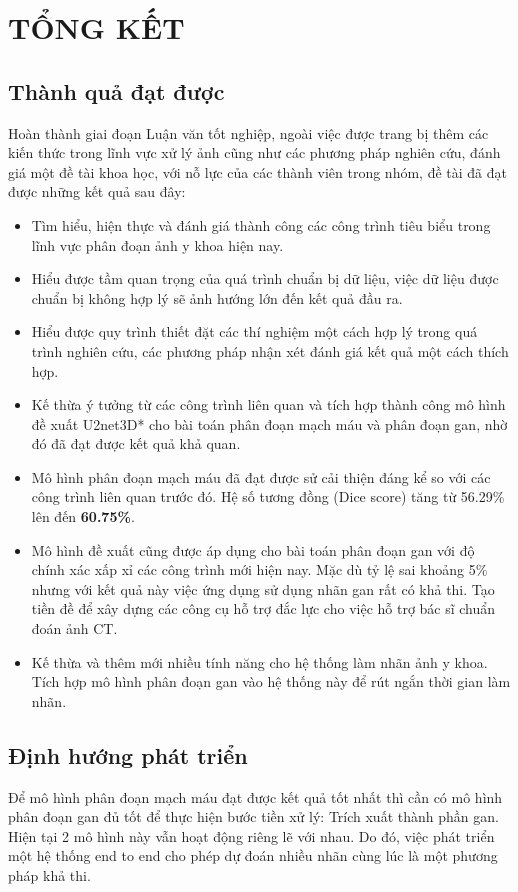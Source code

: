 \chapter{TỔNG KẾT}\label{chap:conclusion}
\section{Thành quả đạt được}
Hoàn thành giai đoạn Luận văn tốt nghiệp, ngoài việc được trang bị thêm các kiến thức trong lĩnh vực xử lý ảnh cũng như các phương pháp nghiên cứu, đánh giá một đề tài khoa học, với nỗ lực của các thành viên trong nhóm, đề tài đã đạt được những kết quả sau đây:
\vspace{-0.4cm}
\begin{itemize}
    \item Tìm hiểu, hiện thực và đánh giá thành công các công trình tiêu biểu trong lĩnh vực phân đoạn ảnh y khoa hiện nay.
    \item Hiểu được tầm quan trọng của quá trình chuẩn bị dữ liệu, việc dữ liệu được chuẩn bị không hợp lý sẽ ảnh hướng lớn đến kết quả đầu ra.
    \item Hiểu được quy trình thiết đặt các thí nghiệm một cách hợp lý trong quá trình nghiên cứu, các phương pháp nhận xét đánh giá kết quả một cách thích hợp.
    \item Kế thừa ý tưởng từ các công trình liên quan và tích hợp thành công mô hình đề xuất U2net3D* cho bài toán phân đoạn mạch máu và phân đoạn gan, nhờ đó đã đạt được kết quả khả quan.
    \item Mô hình phân đoạn mạch máu đã đạt được sử cải thiện đáng kể so với các công trình liên quan trước đó. Hệ số tương đồng (Dice score) tăng từ 56.29\% lên đến \textbf{60.75\%}.
    \item Mô hình đề xuất cũng được áp dụng cho bài toán phân đoạn gan với độ chính xác xấp xỉ các công trình mới hiện nay. Mặc dù tỷ lệ sai khoảng 5\% nhưng với kết quả này việc ứng dụng sử dụng nhãn gan rất có khả thi. Tạo tiền đề để xây dựng các công cụ hỗ trợ đắc lực cho việc hỗ trợ bác sĩ chuẩn đoán ảnh CT.
    \item Kế thừa và thêm mới nhiều tính năng cho hệ thống làm nhãn ảnh y khoa. Tích hợp mô hình phân đoạn gan vào hệ thống này để rút ngắn thời gian làm nhãn.
\end{itemize}

\section{Định hướng phát triển}
Để mô hình phân đoạn mạch máu đạt được kết quả tốt nhất thì cần có mô hình phân đoạn gan đủ tốt để thực hiện bước tiền xử lý: Trích xuất thành phần gan. Hiện tại 2 mô hình này vẫn hoạt động riêng lẽ với nhau. Do đó, việc phát triển một hệ thống end to end cho phép dự đoán nhiều nhãn cùng lúc là một phương pháp khả thi.

